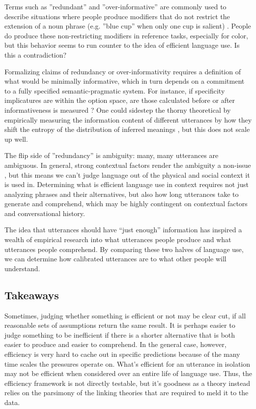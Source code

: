 \documentclass[]{article}
\begin{document}
Terms such as ''redundant'' and ''over-informative'' are commonly used to describe situations where people produce modifiers that do not restrict the extension of a noun phrase (e.g. ''blue cup'' when only one cup is salient) \citep{rubio-fernandez2021}. People do produce these non-restricting modifiers in reference tasks, especially for color, but this behavior seems to run counter to the idea of efficient language use. Is this a contradiction? 

Formalizing claims of redundancy or over-informativity requires a definition of what would be minimally informative, which in turn depends on a commitment to a fully specified semantic-pragmatic system. For instance, if specificity implicatures are within the option space, are those calculated before or after informativeness is measured \citep{bergen}? One could sidestep the thorny theoretical by empirically measuring the information content of different utterances by how they shift the entropy of the distribution of inferred meanings \citep{degen20200406}, but this does not scale up well. 

The flip side of ''redundancy'' is ambiguity: many, many utterances are ambiguous. In general, strong contextual factors render the ambiguity a non-issue \citep{piantadosi2012}, but this means we can't judge language out of the physical and social context it is used in. Determining what is efficient language use in context requires not just analyzing phrases and their alternatives, but also how long utterances take to generate and comprehend, which may be highly contingent on contextual factors and conversational history. 

The idea that utterances should have ``just enough'' information has inspired a wealth of empirical research into what utterances people produce and what utterances people comprehend. By comparing these two halves of language use, we can determine how calibrated utterances are to what other people will understand. 


\subsection{Takeaways}
Sometimes, judging whether something is efficient or not may be clear cut, if all reasonable sets of assumptions return the same result. It is perhaps easier to judge something to be inefficient if there is a shorter alternative that is both easier to produce and easier to comprehend. In the general case, however, efficiency is very hard to cache out in specific predictions because of the many time scales the pressures operate on. What's efficient for an utterance in isolation may not be efficient when considered over an entire life of language use. Thus, the efficiency framework is not directly testable, but it's goodness as a theory instead relies on the parsimony of the linking theories that are required to meld it to the data. 
\end{document}
